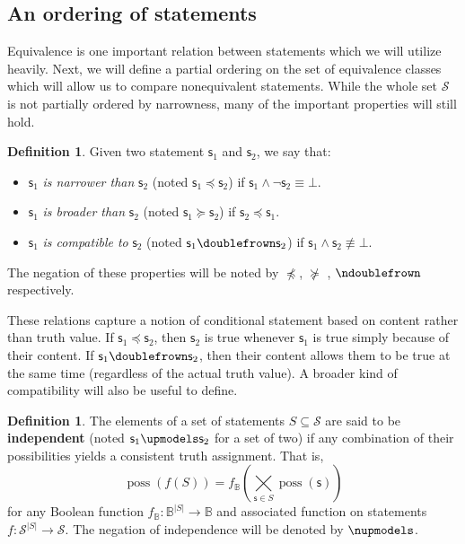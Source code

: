 \documentclass[psamsfonts]{amsart}
\theoremstyle{definition}
\newtheorem{defn}[thm]{Definition}
\theoremstyle{remark}
\numberwithin{equation}{section}
\DeclareMathOperator{\possFn}{poss}
\def\contradiction{\bot}
\def\comp{\doublefrown}
\def\ncomp{\ndoublefrown}
\def\narrower{\preccurlyeq}
\def\nnarrower{\npreccurlyeq}
\def\broader{\succcurlyeq}
\def\nbroader{\nsucccurlyeq}
\def\indep{\upmodels}
\def\nindep{\nupmodels}
\def\AND{\wedge}
\def\NOT{\neg}
\newcommand{\stmt}[1][s] {\mathsf{#1}}
\begin{document}
\subsection{An ordering of statements}

Equivalence is one important relation between statements which we will utilize heavily. Next, we will define a partial ordering on the set of equivalence classes which will allow us to compare nonequivalent statements. While the whole set $\mathcal{S}$ is not partially ordered by narrowness, many of the important properties will still hold. 


\begin{defn}\label{def_statement_narrowness_and_compatibility}
	Given two statement $\stmt_1$ and $\stmt_2$, we say that:
	\begin{itemize}
		\item $\stmt_1$ \emph{is narrower than} $\stmt_2$ (noted $\stmt_1 \narrower \stmt_2$) if $\stmt_1 \AND \NOT \stmt_2 \equiv \contradiction$.
		\item $\stmt_1$ \emph{is broader than} $\stmt_2$ (noted $\stmt_1 \broader \stmt_2$) if $\stmt_2 \narrower \stmt_1$.
		\item $\stmt_1$ \emph{is compatible to} $\stmt_2$ (noted $\stmt_1 \comp \stmt_2$) if $\stmt_1 \AND \stmt_2 \nequiv \contradiction$.

	\end{itemize}
	The negation of these properties will be noted by $\nnarrower$, $\nbroader$ , $\ncomp$ respectively.
\end{defn}

These relations capture a notion of conditional statement based on content rather than truth value. If $\stmt_1\narrower\stmt_2$, then $\stmt_2$ is true whenever $\stmt_1$ is true simply because of their content. If $\stmt_1\comp\stmt_2$, then their content allows them to be true at the same time (regardless of the actual truth value). A broader kind of compatibility will also be useful to define. 

\begin{defn}\label{def_independent_statements}
	The elements of a set of statements $S \subseteq \mathcal{S}$ are said to be \textbf{independent} (noted $\stmt_1 \indep \stmt_2$ for a set of two) if any combination of their possibilities yields a consistent truth assignment. That is, $$\possFn(f(S)) = f_{\mathbb{B}}(\bigtimes\limits_{\stmt \in S} \possFn(\stmt))$$ for any Boolean function $f_{\mathbb{B}} : \mathbb{B}^{|S|} \to \mathbb{B}$ and associated function on statements $f:\mathcal{S}^{|S|}\to\mathcal{S}$. The negation of independence will be denoted by $\nindep$.
\end{defn}
\end{document}
